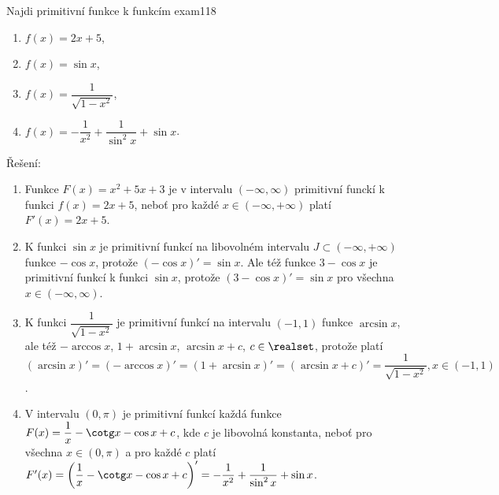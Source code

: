 \begin{mathexam}{Najdi primitivní funkce k funkcím \hfill\cite[s.~254]{Brabec1989}}{exam118}
  \begin{enumerate}
    \item \(f(x) = 2x+5\),
    \item \(f(x) = \sin x\),
    \item \(f(x) = \dfrac{1}{\sqrt{1-x^2}}\),
    \item \(f(x) = -\dfrac{1}{x^2} + \dfrac{1}{\sin^2x} + \sin x\).
  \end{enumerate}
  Řešení:
  \begin{enumerate}
    \item Funkce \(F(x) = x^2+5x+3\) je v intervalu \((-\infty, \infty)\) primitivní funckí k funkci
          \(f(x) = 2x+5\), neboť pro každé \(x\in(-\infty,+\infty)\) platí \(F'(x)=2x+5\).

    \item K funkci \(\sin x\) je primitivní funkcí na libovolném intervalu
          \(J\subset(-\infty,+\infty)\) funkce \(-\cos x\), protože \((-\cos x)' = \sin x\). Ale též
          funkce \(3-\cos x\) je primitivní funkcí k funkci \(\sin x\), protože \((3 - \cos x)' =
          \sin x\) pro všechna \(x\in(-\infty, \infty)\).

    \item K funkci  \(\dfrac{1}{\sqrt{1-x^2}}\) je primitivní funkcí na intervalu \((-1, 1)\) funkce
          \(\arcsin x\), ale též \(-\arccos x\), \(1 + \arcsin x\), \(\arcsin x + c\),
          \(c\in\realset\), protože platí \((\arcsin x)' = (-\arccos x)' = (1+\arcsin x)' = (\arcsin
          x + c)' = \dfrac{1}{\sqrt{1-x^2}}, x\in(-1, 1)\).

    \item V intervalu \((0,\pi)\) je primitivní funkcí každá funkce \(F(x) = \dfrac{1}{x}-\cotg x -
          \cos x + c\), kde \(c\) je libovolná konstanta, neboť pro všechna \(x\in(0,\pi)\) a pro
          každé \(c\) platí \(F'(x) = \left(\dfrac{1}{x}-\cotg x -\cos x +c\right)'= -\dfrac{1}{x^2}
          + \dfrac{1}{\sin^2x} + \sin x\).
  \end{enumerate}
\end{mathexam}